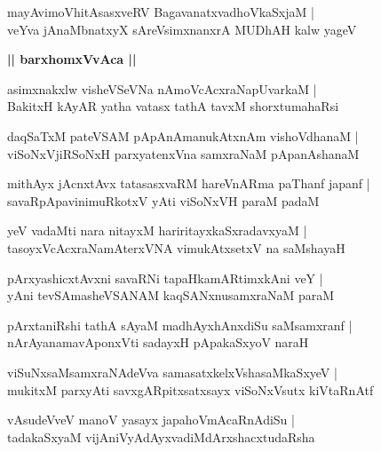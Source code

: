 \documentclass[twoside,12pt,openright]{book}
\newcounter{shloka}[chapter]
\def\uvaca#1{\centerline{{\large\textbf{#1}}}}
\begin{document}
\begin{shloka}%
mayAvimoVhitAsasxveRV BagavanatxvadhoVkaSxjaM |\\
veYva jAnaMbnatxyX sAreVsimxnanxrA MUDhAH kalw yageV 
\end{shloka}

\uvaca{|| barxhomxVvAca ||}

\begin{shloka}%
asimxnakxlw visheVSeVNa nAmoVcAcxraNapUvarkaM |\\
BakitxH kAyAR yatha vatasx tathA tavxM shorxtumahaRsi 
\end{shloka}

\begin{shloka}%
daqSaTxM pateVSAM pApAnAmanukAtxnAm vishoVdhanaM |\\
viSoNxVjiRSoNxH parxyatenxVna samxraNaM pApanAshanaM 
\end{shloka}

\begin{shloka}%
mithAyx jAcnxtAvx tatasasxvaRM hareVnARma paThanf japanf |\\
savaRpApavinimuRkotxV yAti viSoNxVH paraM padaM 
\end{shloka}

\begin{shloka}%
yeV vadaMti nara nitayxM hariritayxkaSxradavxyaM |\\
tasoyxVcAcxraNamAterxVNA vimukAtxsetxV na saMshayaH 
\end{shloka}

\begin{shloka}%
pArxyashicxtAvxni savaRNi tapaHkamARtimxkAni veY |\\
yAni tevSAmasheVSANAM kaqSANxnusamxraNaM paraM 
\end{shloka}

\begin{shloka}%
pArxtaniRshi tathA sAyaM madhAyxhAnxdiSu saMsamxranf |\\
nArAyanamavAponxVti sadayxH pApakaSxyoV naraH 
\end{shloka}

\begin{shloka}%
viSuNxsaMsamxraNAdeVva samasatxkelxVshasaMkaSxyeV |\\
mukitxM parxyAti savxgARpitxsatxsayx viSoNxVsutx kiVtaRnAtf
\end{shloka}

\begin{shloka}%
vAsudeVveV manoV yasayx japahoVmAcaRnAdiSu |\\
tadakaSxyaM vijAniVyAdAyxvadiMdArxshacxtudaRsha
\end{shloka}
\end{document}
